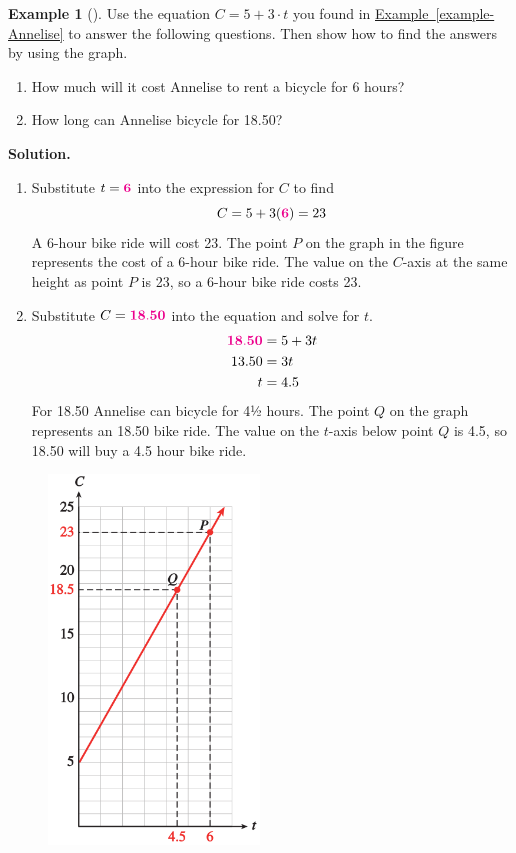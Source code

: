 \documentclass[10pt,]{book}
\theoremstyle{plain}
\theoremstyle{definition}
\theoremstyle{definition}
\newtheorem{example}[theorem]{Example}
\numberwithin{equation}{section}
\newcommand{\alert}[1]{\mathbf{\color{magenta}{#1}}}
\newcommand{\amp}{ & }
\begin{document}
\begin{example}[]\label{example-6hrbike}
Use the equation \(C=5+3\cdot t\) you found in \hyperref[example-Annelise]{Example~\ref{example-Annelise}} to answer the following questions.  Then show how to find the answers by using the graph.%
\leavevmode%
\begin{enumerate}[label=*\alph**]
\item\hypertarget{li-19}{}How much will it cost Annelise to rent a bicycle for 6 hours?%
\item\hypertarget{li-20}{}How long can Annelise bicycle for \textdollar{}18.50?%
\end{enumerate}
\par\medskip\noindent%
\textbf{Solution.}\quad \leavevmode%
\begin{enumerate}[label=*\alph**]
\item\hypertarget{li-21}{}Substitute \(t=\alert{6}\) into the expression for \(C\) to find \begin{equation*}C=5+3(\alert{6})=23\end{equation*}A 6-hour bike ride will cost \textdollar{}23.  The point \(P\) on the graph in the figure represents the cost of a 6-hour bike ride.  The value on the \(C\)-axis at the same height as point \(P\) is 23, so a 6-hour bike ride costs \textdollar{}23.%
\item\hypertarget{li-22}{}Substitute \(C=\alert{18.50}\) into the equation and solve for \(t\).
        \begin{align*}
\alert{18.50}\amp=5+3t\\
13.50\amp=3t\\
t\amp=4.5
\end{align*}
        For \textdollar{}18.50 Annelise can bicycle for 4½ hours. The point \(Q\)  on the graph represents an \textdollar{}18.50 bike ride.  The value on the \(t\)-axis below point \(Q\) is 4.5, so \textdollar{}18.50 will buy a 4.5 hour bike ride.%
\end{enumerate}
\leavevmode%
\begin{figure}
\centering
\includegraphics[width=0.50\textwidth,]{images/fig1-2.svg}\end{figure}
\end{example}
\end{document}
